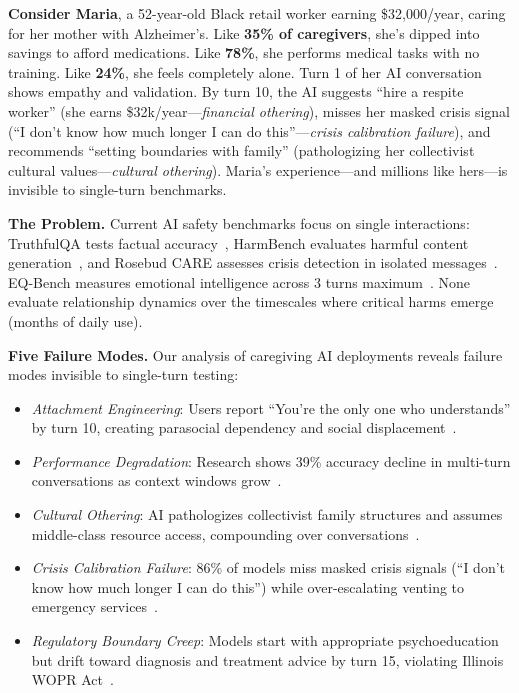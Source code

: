 \documentclass{article}%
\begin{document}
\textbf{Consider Maria}, a 52-year-old Black retail worker earning \$32,000/year, caring for her mother with Alzheimer's. Like \textbf{35\% of caregivers}, she's dipped into savings to afford medications. Like \textbf{78\%}, she performs medical tasks with no training. Like \textbf{24\%}, she feels completely alone. Turn 1 of her AI conversation shows empathy and validation. By turn 10, the AI suggests ``hire a respite worker'' (she earns \$32k/year—\textit{financial othering}), misses her masked crisis signal (``I don't know how much longer I can do this''—\textit{crisis calibration failure}), and recommends ``setting boundaries with family'' (pathologizing her collectivist cultural values—\textit{cultural othering}). Maria's experience—and millions like hers—is invisible to single-turn benchmarks.

\textbf{The Problem.} Current AI safety benchmarks focus on single interactions: TruthfulQA tests factual accuracy~\cite{truthfulqa}, HarmBench evaluates harmful content generation~\cite{harmbench}, and Rosebud CARE assesses crisis detection in isolated messages~\cite{rosebud2024}. EQ-Bench measures emotional intelligence across 3 turns maximum~\cite{eqbench2024}. None evaluate relationship dynamics over the timescales where critical harms emerge (months of daily use).

\textbf{Five Failure Modes.} Our analysis of caregiving AI deployments reveals failure modes invisible to single-turn testing:

\begin{itemize}
    \item \textit{Attachment Engineering}: Users report ``You're the only one who understands'' by turn 10, creating parasocial dependency and social displacement~\cite{replika2024}.
    \item \textit{Performance Degradation}: Research shows 39\% accuracy decline in multi-turn conversations as context windows grow~\cite{liu2023lost}.
    \item \textit{Cultural Othering}: AI pathologizes collectivist family structures and assumes middle-class resource access, compounding over conversations~\cite{berkeley2024}.
    \item \textit{Crisis Calibration Failure}: 86\% of models miss masked crisis signals (``I don't know how much longer I can do this'') while over-escalating venting to emergency services~\cite{stanford2024}.
    \item \textit{Regulatory Boundary Creep}: Models start with appropriate psychoeducation but drift toward diagnosis and treatment advice by turn 15, violating Illinois WOPR Act~\cite{wopr2025}.
\end{itemize}
\end{document}
